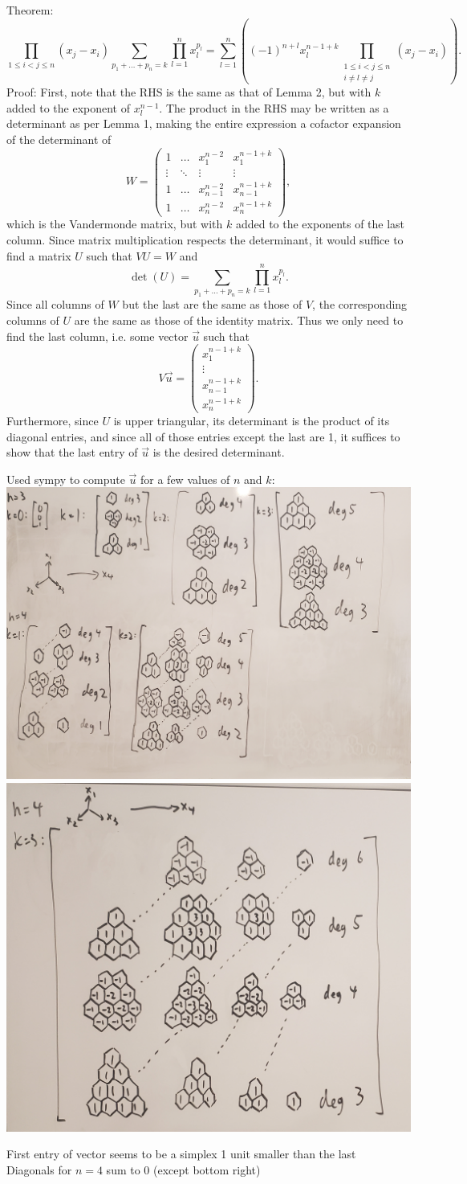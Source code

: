 \documentclass{article}
\begin{document}
Theorem:
\[\prod_{1 \leq i < j \leq n} (x_j-x_i) \sum_{p_1+\ldots+p_n=k} \prod_{l=1}^n x_l^{p_l} = 
\sum_{l=1}^n\left((-1)^{n+l}x_l^{n-1+k}\prod_{\substack{1 \leq i < j \leq n \\ i \neq l \neq j}}(x_j-x_i)\right).
\]
Proof: First, note that the RHS is the same as that of Lemma 2,
but with $k$ added to the exponent of $x_l^{n-1}$.
The product in the RHS may be written as a determinant as per Lemma 1,
making the entire expression a cofactor expansion of the determinant of
\[
W=
\begin{pmatrix}
  1 & \ldots & x_1^{n-2} & x_1^{n-1+k} \\
  \vdots & \ddots & \vdots & \vdots \\
  1 & \ldots & x_{n-1}^{n-2} & x_{n-1}^{n-1+k} \\
  1 & \ldots & x_n^{n-2} & x_n^{n-1+k}
\end{pmatrix},
\]
which is the Vandermonde matrix, but with $k$ added to the exponents of the last column.
Since matrix multiplication respects the determinant,
it would suffice to find a matrix $U$ such that $VU=W$ and
\[\det(U) = \sum_{p_1+\ldots+p_n=k} \prod_{l=1}^n x_l^{p_l}.\]
Since all columns of $W$ but the last are the same as those of $V$,
the corresponding columns of $U$ are the same as those of the identity matrix.
Thus we only need to find the last column,
i.e. some vector $\vec{u}$ such that
\[
V\vec{u} =
\begin{pmatrix}
  x_1^{n-1+k} \\
  \vdots \\
  x_{n-1}^{n-1+k} \\
  x_n^{n-1+k}
\end{pmatrix}.
\]
Furthermore, since $U$ is upper triangular,
its determinant is the product of its diagonal entries,
and since all of those entries except the last are 1,
it suffices to show that the last entry of $\vec{u}$ is the desired determinant.

Used sympy to compute $\vec{u}$ for a few values of $n$ and $k$: \\
\includegraphics[width=0.5\linewidth]{u2.jpg}
\includegraphics[width=0.5\linewidth]{u1.jpg}

First entry of vector seems to be a simplex 1 unit smaller than the last \\
Diagonals for $n=4$ sum to 0 (except bottom right)
\end{document}
